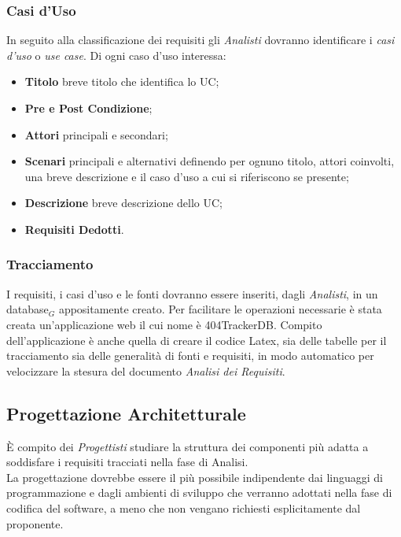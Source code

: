 \subsubsection{Casi d'Uso}
In seguito alla classificazione dei requisiti gli \textit{Analisti} dovranno identificare i \textit{casi d'uso} o \textit{use case}.
Di ogni caso d'uso interessa:
\begin{itemize}
\item \textbf{Titolo} breve titolo che identifica lo UC;
\item \textbf{Pre e Post Condizione};
\item \textbf{Attori} principali e secondari;
\item \textbf{Scenari} principali e alternativi definendo per ognuno titolo, attori coinvolti, una breve descrizione e il caso d'uso a cui si riferiscono se presente;
\item \textbf{Descrizione} breve descrizione dello UC;
\item \textbf{Requisiti Dedotti}.
\end{itemize} 
\subsubsection{Tracciamento}
I requisiti, i casi d'uso e le fonti dovranno essere inseriti, dagli \textit{Analisti}, in un database$_G$ appositamente creato. Per facilitare le operazioni necessarie è stata creata un'applicazione web il cui nome è 404TrackerDB.
Compito dell'applicazione è anche quella di creare il codice {Latex}, sia delle tabelle per il tracciamento sia delle generalità di fonti e requisiti, in modo automatico per velocizzare la stesura del documento \textit{Analisi dei Requisiti}. 


\subsection{Progettazione Architetturale}
È compito dei \textit{Progettisti} studiare la struttura dei componenti più adatta a soddisfare i requisiti tracciati nella fase di Analisi. \\
La progettazione dovrebbe essere il più possibile indipendente dai linguaggi di programmazione e dagli ambienti di sviluppo che verranno adottati nella fase di codifica del software, a meno che non vengano richiesti esplicitamente dal proponente.
